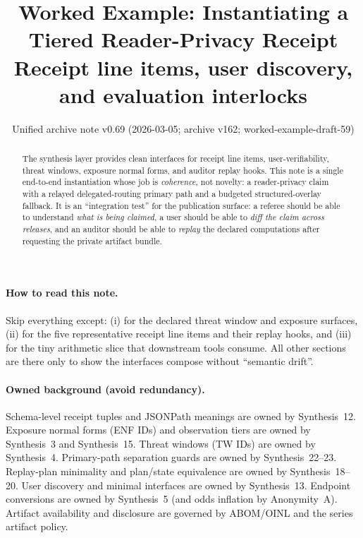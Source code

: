 \documentclass[11pt]{article}
\title{Worked Example: Instantiating a Tiered Reader-Privacy Receipt\\
\large Receipt line items, user discovery, and evaluation interlocks}
\author{}
\date{Unified archive note v0.69 (2026-03-05; archive v162; worked-example-draft-59)}
\begin{document}
\maketitle

\begin{abstract}
The synthesis layer provides clean interfaces for receipt line items, user-verifiability, threat windows, exposure normal forms, and auditor replay hooks.
This note is a single end-to-end instantiation whose job is \emph{coherence}, not novelty:
a reader-privacy claim with a relayed delegated-routing primary path and a budgeted structured-overlay fallback.
It is an ``integration test'' for the publication surface: a referee should be able to understand \emph{what is being claimed}, a user should be able to \emph{diff the claim across releases}, and an auditor should be able to \emph{replay} the declared computations after requesting the private artifact bundle.
\end{abstract}

\paragraph{How to read this note.}
Skip everything except:
(i)  for the declared threat window and exposure surfaces,
(ii)  for the five representative receipt line items and their replay hooks,
and (iii)  for the tiny arithmetic slice that downstream tools consume.
All other sections are there only to show the interfaces compose without ``semantic drift''.

\paragraph{Owned background (avoid redundancy).}
Schema-level receipt tuples and JSONPath meanings are owned by Synthesis~12.\cite{series:receiptitems}
Exposure normal forms (ENF IDs) and observation tiers are owned by Synthesis~3 and Synthesis~15.\cite{series:traceifaces,series:tieredobs}
Threat windows (TW IDs) are owned by Synthesis~4.\cite{series:threatwindows}
Primary-path separation guards are owned by Synthesis~22--23.\cite{series:primarysepmanifest,series:probsep}
Replay-plan minimality and plan/state equivalence are owned by Synthesis~18--20.\cite{series:planstateequiv,series:auditorreplay}
User discovery and minimal interfaces are owned by Synthesis~13.\cite{series:userminiface}
Endpoint conversions are owned by Synthesis~5 (and odds inflation by Anonymity~A).\cite{series:endpointbridge,series:oddsinflation}
Artifact availability and disclosure are governed by ABOM/OINL and the series artifact policy.\cite{series:abomoinl,series:artifactpolicy}
\end{document}
